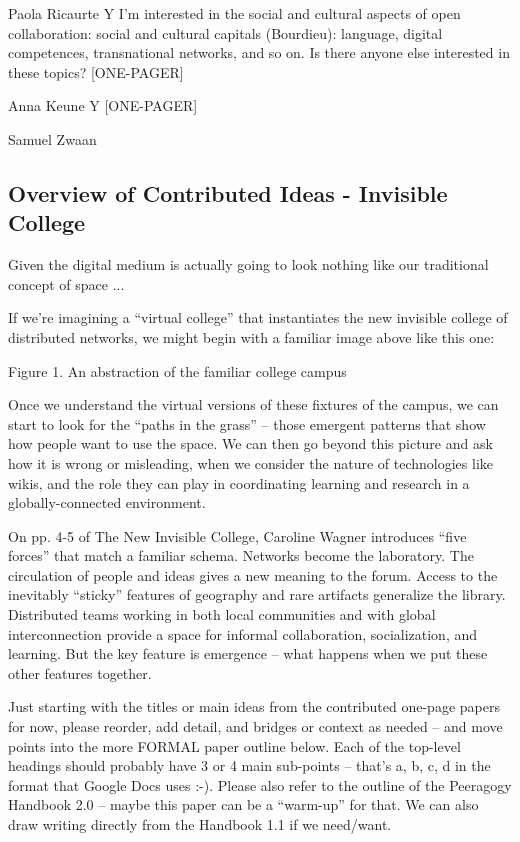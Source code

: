 \documentclass{acm_proc_article-sp}
\begin{document}
    Paola Ricaurte Y I'm interested in the social and cultural aspects of open collaboration: social and cultural capitals (Bourdieu): language, digital competences, transnational networks, and so on. Is there anyone else interested in these topics? [ONE-PAGER]

    Anna Keune Y [ONE-PAGER]

    Samuel Zwaan 

\subsection{Overview of Contributed Ideas - Invisible College}

Given the digital medium is actually going to look nothing like our traditional concept of space ...

If we're imagining a ``virtual college'' that instantiates the new invisible college of distributed networks, we might begin with a familiar image above like this one:

Figure 1. An abstraction of the familiar college campus

Once we understand the virtual versions of these fixtures of the campus, we can start to look for the ``paths in the grass'' -- those emergent patterns that show how people want to use the space. We can then go beyond this picture and ask how it is wrong or misleading, when we consider the nature of technologies like wikis, and the role they can play in coordinating learning and research in a globally-connected environment.

On pp. 4-5 of The New Invisible College, Caroline Wagner introduces ``five forces'' that match a familiar schema. Networks become the laboratory. The circulation of people and ideas gives a new meaning to the forum. Access to the inevitably ``sticky'' features of geography and rare artifacts generalize the library. Distributed teams working in both local communities and with global interconnection provide a space for informal collaboration, socialization, and learning. But the key feature is emergence -- what happens when we put these other features together.

Just starting with the titles or main ideas from the contributed one-page papers for now, please reorder, add detail, and bridges or context as needed -- and move points into the more FORMAL paper outline below. Each of the top-level headings should probably have 3 or 4 main sub-points -- that's a, b, c, d in the format that Google Docs uses :-). Please also refer to the outline of the Peeragogy Handbook 2.0 -- maybe this paper can be a ``warm-up'' for that. We can also draw writing directly from the Handbook 1.1 if we need/want.
\end{document}
